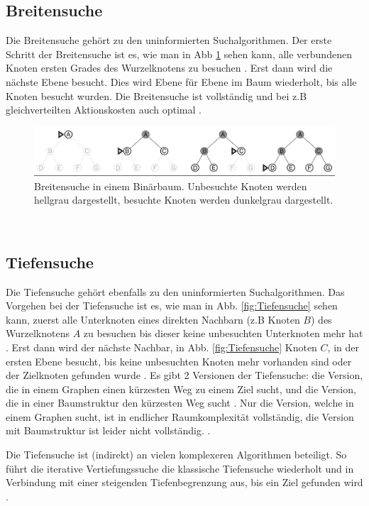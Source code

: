 \subsection{Breitensuche}
\label{Breitensuche}
Die Breitensuche gehört zu den uninformierten Suchalgorithmen. 
Der erste Schritt der Breitensuche ist es, wie man in Abb \ref{fig:Breitensuche} sehen kann, alle verbundenen Knoten ersten Grades des Wurzelknotens zu besuchen \cite[80-82]{Russell:10}.
Erst dann wird die nächste Ebene besucht. Dies wird Ebene für Ebene im Baum wiederholt, bis alle Knoten besucht wurden. 
Die Breitensuche ist vollständig und bei z.B gleichverteilten Aktionskosten auch optimal \cite[80-82]{Russell:10}.
\begin{figure}
	\centering
	\includegraphics[width=1.0\textwidth]{images/breitensuche.png}
	\caption{Breitensuche in einem Binärbaum. Unbesuchte Knoten werden hellgrau dargestellt, besuchte Knoten werden dunkelgrau dargestellt.}
	\label{fig:Breitensuche}
\end{figure}
\\
\newpage
\subsection{Tiefensuche}
\label{Tiefensuche}
Die Tiefensuche gehört ebenfalls zu den uninformierten Suchalgorithmen.
Das Vorgehen bei der Tiefensuche ist es, wie man in Abb. \ref{fig:Tiefensuche} sehen kann, zuerst alle Unterknoten eines direkten Nachbarn (z.B Knoten $B$) des Wurzelknotens $A$ zu besuchen bis dieser 
keine unbesuchten Unterknoten mehr hat \cite[85,86]{Russell:10}.
Erst dann wird der nächste Nachbar, in Abb. \ref{fig:Tiefensuche} Knoten $C$, in der ersten Ebene besucht, bis keine unbesuchten Knoten mehr vorhanden sind oder der Zielknoten gefunden wurde \cite[85,86]{Russell:10}.
Es gibt 2 Versionen der Tiefensuche: die Version, die in einem Graphen einen kürzesten Weg zu einem Ziel sucht, und die Version, 
die in einer Baumstruktur den kürzesten Weg sucht \cite[85,86]{Russell:10}.
Nur die Version, welche in einem Graphen sucht, ist in endlicher Raumkomplexität vollständig, die Version mit Baumstruktur ist leider nicht vollständig. \cite[85,86]{Russell:10}.

Die Tiefensuche ist (indirekt) an vielen komplexeren Algorithmen beteiligt. 
So führt die iterative Vertiefungssuche die klassische Tiefensuche wiederholt und in Verbindung mit einer steigenden 
Tiefenbegrenzung aus, bis ein Ziel gefunden wird \cite[108,109]{Russell:10}.

